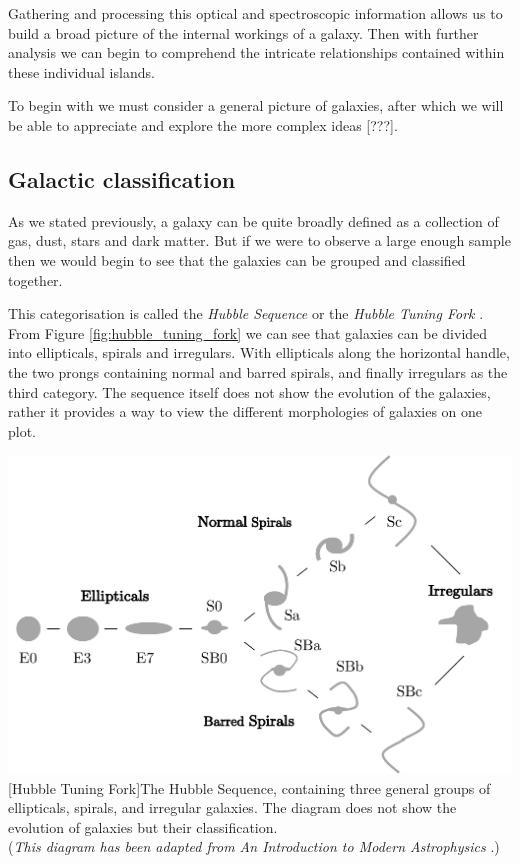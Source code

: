 \documentclass[12pt, twocolumn]{revtex4}    %
\begin{document}
Gathering and processing this optical and spectroscopic information allows us to build a broad picture of the internal workings of a galaxy. Then with further analysis we can begin to comprehend the intricate relationships contained within these individual islands. 

To begin with we must consider a general picture of galaxies, after which we will be able to appreciate and explore the more complex ideas [???].

\subsection{Galactic classification}

As we stated previously, a galaxy can be quite broadly defined as a collection of gas, dust, stars and dark matter. But if we were to observe a large enough sample then we would begin to see that the galaxies can be grouped and classified together.

This categorisation is called the \textit{Hubble Sequence} or the \textit{Hubble Tuning Fork} \cite{carroll_astro}. From Figure \ref{fig:hubble_tuning_fork} we can see that galaxies can be divided into ellipticals, spirals and irregulars. With ellipticals along the horizontal handle, the two prongs containing normal and barred spirals, and finally irregulars as the third category. The sequence itself does not show the evolution of the galaxies, rather it provides a way to view the different morphologies of galaxies on one plot.

\begin{center}
\includegraphics[width=1.0\linewidth]{introduction/hubble_tuning_fork}
[Hubble Tuning Fork]{The Hubble Sequence, containing three general groups of ellipticals, spirals, and irregular galaxies. The diagram does not show the evolution of galaxies but their classification. \\ (\textit{This diagram has been adapted from An Introduction to Modern Astrophysics} \cite{carroll_astro}.)}
\label{fig:hubble_tuning_fork}
\end{center}
\end{document}
